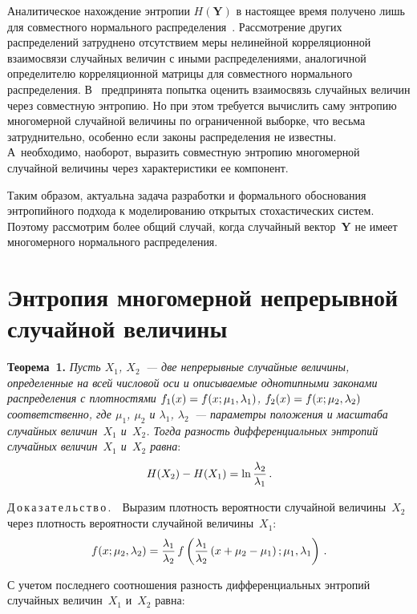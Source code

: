 \begin{multicols}{2}
  Аналитическое нахождение энтропии $H(\mathbf{Y})$ в настоящее время 
получено лишь для совместного нормального распределения~\cite{8-t}. 
Рассмотрение других распределений затруднено отсутствием меры нелинейной 
корреляционной взаимосвязи случайных величин с иными распределениями, 
аналогичной определителю корреляционной матрицы для совместного 
нормального распределения. В~\cite{9-t} предпринята попытка оценить 
взаимосвязь случайных величин через совместную энтропию. Но при этом 
требуется вычислить саму энтропию многомерной случайной величины по 
ограниченной выборке, что весьма затруднительно, особенно если законы 
распределения не известны. А~необходимо, наоборот, выразить совместную 
энтропию многомерной случайной величины через характеристики ее 
компонент.
  
  Таким образом, актуальна задача разработки и формального обоснования 
энтропийного подхода к моделированию открытых стохастических систем. 
Поэтому рассмотрим более общий случай, когда случайный вектор~\textbf{Y} 
не имеет многомерного нормального распределения.
  
  \section{Энтропия многомерной непрерывной случайной 
величины}
  
  \noindent
  \textbf{Теорема~1.} \textit{Пусть $X_{1}$, $X_2$~--- две непрерывные 
случайные величины, определенные на всей числовой оси и описываемые 
однотипными законами распределения с плотностями $f_1(x) \hm= 
f(x;\mu_1,\lambda_1)$, $f_2(x)\hm= f(x; \mu_2,\lambda_2)$ соответственно, где 
$\mu_1$, $\mu_2$ и $\lambda_1$, $\lambda_2$~--- параметры положения и 
масштаба случайных \mbox{величин}~$X_1$ и~$X_2$. Тогда разность 
дифференциальных энтропий случайных величин~$X_1$ и~$X_2$ равна}:
  \begin{equation}
  H(X_2) -H(X_1) =\ln \displaystyle\frac{\displaystyle \lambda_2\mathstrut}{\displaystyle \lambda_1\mathstrut}\,.
  \label{e3-t}
  \end{equation}
  
  \noindent
  Д\,о\,к\,а\,з\,а\,т\,е\,л\,ь\,с\,т\,в\,о\,.\ \  Выразим плотность вероятности 
случайной величины~$X_2$ через плотность вероятности случайной 
величины~$X_1$:
  $$
  f(x;\mu_2,\lambda_2) =\displaystyle\frac{\displaystyle \lambda_1\mathstrut}{\displaystyle \lambda_2\mathstrut}\,f\left( 
\displaystyle\frac{\displaystyle \lambda_1\mathstrut}{\displaystyle \lambda_2\mathstrut}\left( x+\mu_2-\mu_1\right);\mu_1,\lambda_1\right)\,.
  $$
  
  С учетом последнего соотношения разность дифференциальных энтропий 
случайных величин~$X_1$ и~$X_2$ равна:


\end{multicols}
